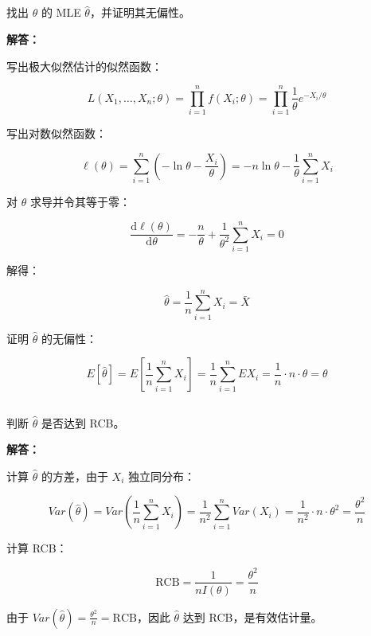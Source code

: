\documentclass[12pt,a4paper]{article}
\begin{document}
\subsection{}

找出 $\theta$ 的 MLE $\hat{\theta}$，并证明其无偏性。

\begin{answerbox}
\textbf{解答：}

写出极大似然估计的似然函数：

$$
L(X_1, \ldots, X_n; \theta) = \prod_{i=1}^n f(X_i; \theta) = \prod_{i=1}^n \frac{1}{\theta} e^{-X_i/\theta}
$$

写出对数似然函数：

$$
\ell(\theta) = \sum_{i=1}^n \left( -\ln \theta - \frac{X_i}{\theta} \right) = -n \ln \theta - \frac{1}{\theta} \sum_{i=1}^n X_i 
$$

对 $\theta$ 求导并令其等于零：

$$
\frac{\text{d} \ell(\theta)}{\text{d} \theta} = -\frac{n}{\theta} + \frac{1}{\theta^2} \sum_{i=1}^n X_i = 0
$$

解得：

$$
\hat{\theta} = \frac{1}{n} \sum_{i=1}^n X_i = \bar{X}
$$

证明 $\hat{\theta}$ 的无偏性：

$$
E[\hat{\theta}] = E\left[\frac{1}{n} \sum_{i=1}^n X_i\right] = \frac{1}{n} \sum_{i=1}^n EX_i = \frac{1}{n} \cdot n \cdot \theta = \theta
$$

\end{answerbox}

\subsection{}

判断 $\hat{\theta}$ 是否达到 RCB。

\begin{answerbox}
\textbf{解答：}

计算 $\hat{\theta}$ 的方差，由于 $X_i$ 独立同分布：

$$
Var(\hat{\theta}) = Var\left(\frac{1}{n} \sum_{i=1}^n X_i\right) = \frac{1}{n^2} \sum_{i=1}^n Var(X_i) = \frac{1}{n^2} \cdot n \cdot \theta^2 = \frac{\theta^2}{n}
$$

计算 RCB：

$$
\text{RCB} = \frac{1}{nI(\theta)} = \frac{\theta^2}{n}
$$

由于 $Var(\hat{\theta}) = \frac{\theta ^2}{n} = \text{RCB}$，因此 $\hat{\theta}$ 达到 RCB，是有效估计量。

\end{answerbox}
\end{document}
